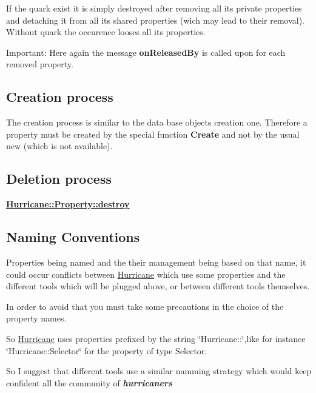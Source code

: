 If the quark exist it is simply destroyed after removing all its private properties and detaching it from all its shared properties (wich may lead to their removal). Without quark the occurence looses all its properties.

\begin{DoxyParagraph}{Important\-:}
Here again the message {\bfseries on\-Released\-By} is called upon for each removed property.
\end{DoxyParagraph}
\hypertarget{classHurricane_1_1Property_secPropertyCreationProcess}{}\subsection{Creation process}\label{classHurricane_1_1Property_secPropertyCreationProcess}
The creation process is similar to the data base objects creation one. Therefore a property must be created by the special function {\bfseries Create} and not by the usual new (which is not available).\hypertarget{classHurricane_1_1Property_secPropertyDeletionProcess}{}\subsection{Deletion process}\label{classHurricane_1_1Property_secPropertyDeletionProcess}
{\bfseries \hyperlink{classHurricane_1_1Property_ab60362699e6c6ea35ace45dbd1075a2f}{Hurricane\-::\-Property\-::destroy}}\hypertarget{classHurricane_1_1Property_secPropertyNaming}{}\subsection{Naming Conventions}\label{classHurricane_1_1Property_secPropertyNaming}
Properties being named and the their management being based on that name, it could occur conflicts between \hyperlink{namespaceHurricane}{Hurricane} which use some properties and the different tools which will be plugged above, or between different tools themselves.

In order to avoid that you must take some precautions in the choice of the property names.

So \hyperlink{namespaceHurricane}{Hurricane} uses properties prefixed by the string \char`\"{}\-Hurricane\-::\char`\"{},like for instance \char`\"{}\-Hurricane\-::\-Selector\char`\"{} for the property of type Selector.

So I suggest that different tools use a similar namming strategy which would keep confident all the community of {\bfseries {\itshape hurricaners}}

